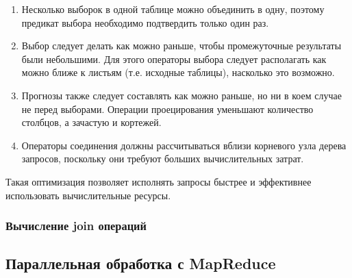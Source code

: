 \documentclass{article}
\begin{document}
\begin{enumerate}
    \item Несколько выборок в одной таблице можно объединить в одну, поэтому предикат выбора
    необходимо подтвердить только один раз.
    \item Выбор следует делать как можно раньше, чтобы промежуточные результаты были небольшими.
    Для этого операторы выбора следует располагать как можно ближе к листьям (т.е.
    исходные таблицы), насколько это возможно.
    \item Прогнозы также следует составлять как можно раньше, но ни в коем случае не перед выборами.
    Операции проецирования уменьшают количество столбцов, а зачастую и кортежей.
    \item Операторы соединения должны рассчитываться вблизи корневого узла дерева запросов, поскольку они
    требуют больших вычислительных затрат.
\end{enumerate}
Такая оптимизация позволяет исполнять запросы быстрее и эффективнее использовать вычислительные ресурсы.
\subsubsection{Вычисление join операций}

\subsection{Параллельная обработка с MapReduce}
\end{document}
